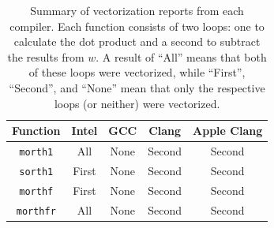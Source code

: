 \documentclass{article}
\begin{document}
    \begin{table}
        \centering
        \begin{tabular}{ccccc}
            \toprule
            Function & Intel & GCC & Clang & Apple Clang \\
            \midrule
            \texttt{morth1} & All & None & Second & Second \\
            \texttt{sorth1} & First & None & Second & Second \\
            \texttt{morthf} & First & None & Second & Second \\
            \texttt{morthfr} & All & None & Second & Second \\
            \bottomrule
        \end{tabular}
        \caption{Summary of vectorization reports from each compiler. Each function consists of two loops: one to calculate the dot product and a second to subtract the results from $w$. A result of ``All'' means that both of these loops were vectorized, while ``First'', ``Second'', and ``None'' mean that only the respective loops (or neither) were vectorized.}
        \label{tab:vec}
    \end{table}
\end{document}
